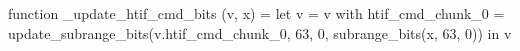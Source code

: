 function _update_htif_cmd_bits (v, x) = let v = { v with htif_cmd_chunk_0 = update_subrange_bits(v.htif_cmd_chunk_0, 63, 0, subrange_bits(x, 63, 0)) } in
  v
